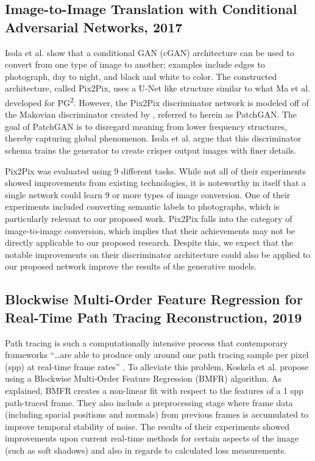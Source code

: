 \documentclass{article}
\begin{document}
\subsection*{Image-to-Image Translation with Conditional Adversarial Networks, 2017}
\nocite{pix2pix}
Isola et al. show that a conditional GAN (cGAN) architecture can be used to
convert from one type of image to another; examples include edges to photograph,
day to night, and black and white to color. The constructed architecture, called
Pix2Pix, uses a U-Net like structure similar to what Ma et al. developed for
PG\textsuperscript{2}. However, the Pix2Pix discriminator network is modeled off
of the Makovian discriminator created by \cite{markovian},
referred to herein as PatchGAN.
The goal of PatchGAN is to disregard meaning from lower frequency structures,
thereby capturing global phenomenon. Isola et al. argue that this discriminator
schema trains the generator to create crisper output images with finer details.

Pix2Pix was evaluated using 9 different tasks. While not all of their
experiments showed improvements from existing technologies, it is noteworthy
in itself that a single network could learn 9 or more types of image conversion.
One of their experiments included converting semantic labels to photographs,
which is particularly relevant to our proposed work.
Pix2Pix falls into the category of image-to-image conversion, which implies that
their achievements may not be directly applicable to our proposed research.
Despite this, we expect that the notable improvements on their discriminator 
architecture could also be applied to our proposed network improve the results
of the generative models.

\subsection*{Blockwise Multi-Order Feature Regression for Real-Time Path Tracing Reconstruction, 2019}
\nocite{path_tracing}
Path tracing is such a computationally intensive process that contemporary
frameworks
``\dots are able to produce only around one path tracing sample per pixel (spp)
at real-time frame rates'' \cite{path_tracing}.
To alleviate this problem, Koskela et al. propose using a
Blockwise Multi-Order Feature Regression (BMFR) algorithm.
As explained, BMFR creates a non-linear fit with respect to the
features of a 1 spp path-traced
frame. They also include a preprocessing stage where frame data (including
spacial positions and normals) from previous frames is accumulated to improve
temporal stability of noise. The results of their experiments showed
improvements upon current real-time methods for certain aspects of the image
(such as soft shadows) and also in regards to calculated loss measurements.
\end{document}
